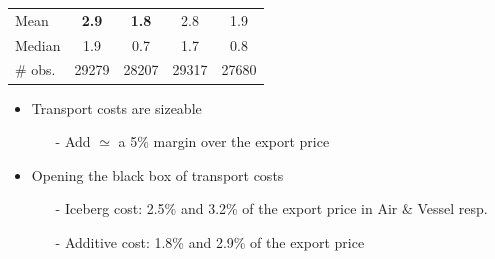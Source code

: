 \documentclass[10 pt,Helvetica, french]{beamer}
\begin{document}
\begin{frame}[label=slide_results_summary]
\begin{table}[htbp]
{\begin{center}
\begin{tabular}{l|cc|cc}
    Mean  & \bf{2.9} & \bf{1.8} & 2.8 & 1.9 \\
    Median & 1.9 & 0.7 & 1.7 & 0.8 \\ \hline
        \# obs. & 29279 & 28207 & 29317 & 27680 \\ \hline \hline
  \end{tabular}
\end{center}}
  \end{table}%
\begin{itemize}
\item Transport costs are sizeable \vspace{0.1cm}
\begin{itemize}
\item[-] Add $\simeq$ a 5\% margin over the export price \vspace{0.1cm}
\end{itemize}
\item Opening the black box of transport costs \vspace{0.1cm}
\begin{itemize}
\item[-] Iceberg cost: 2.5\% and 3.2\% of the export price in Air \& Vessel resp.
\item[-] Additive cost: 1.8\% and 2.9\% of the export price
\end{itemize}
\end{itemize}
\end{frame}
\end{document}

